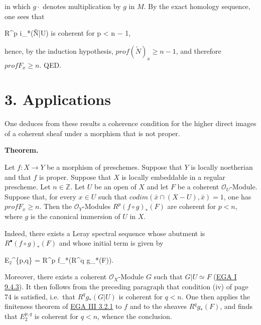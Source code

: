 \documentclass[
  11pt,
  a4paper,
]{book}
\newenvironment{Shaded}{}{}
\newcommand{\NormalTok}[1]{#1}
\begin{document}
in which \(g\cdot\) denotes multiplication by \(g\) in \(M\). By the
exact homology sequence, one sees that

\begin{Shaded}
\begin{Highlighting}[]
\NormalTok{R\^{}p i\_*(Ñ|U)    is coherent for p \textless{} n − 1,}
\end{Highlighting}
\end{Shaded}

hence, by the induction hypothesis,
\(prof(\tilde{N})_{x} \geqslant n - 1\), and therefore
\(prof F_{x} \geqslant n\). QED.

\section{3. Applications}\label{applications}

One deduces from these results a coherence condition for the higher
direct images of a coherent sheaf under a morphism that is not proper.

\textbf{Theorem.}

Let \(f : X \to Y\) be a morphism of preschemes. Suppose that \(Y\) is
locally noetherian and that \(f\) is proper. Suppose that \(X\) is
locally embeddable in a regular prescheme. Let \(n \in \mathbb{Z}\). Let
\(U\) be an open of \(X\) and let \(F\) be a coherent
\(\mathcal{O}_{U}\)-Module. Suppose that, for every \(x \in U\) such
that \(codim(\bar{x} \cap (X - U), \bar{x}) =
1\), one has \(prof F_{x} \geqslant n\). Then the
\(\mathcal{O}_{Y}\)-Modules \(R^{p}(f \circ g)_{*}(F)\) are coherent for
\(p <
n\), where \(g\) is the canonical immersion of \(U\) in \(X\).

Indeed, there exists a Leray spectral sequence whose abutment is
\(R^{\bullet}(f \circ g)_{*}(F)\) and whose initial term is given by

\begin{Shaded}
\begin{Highlighting}[]
\NormalTok{E₂\^{}\{p,q\} = R\^{}p f\_*(R\^{}q g\_*(F)).}
\end{Highlighting}
\end{Shaded}

Moreover, there exists a coherent \(\mathcal{O}_{X}\)-Module \(G\) such
that \(G|U \simeq F\)
(\href{https://jcreinhold.github.io/ega/i/01-09-complements-on-quasi-coherent-sheaves.html\#94-extension-of-quasi-coherent-sheaves}{EGA
I 9.4.3}). It then follows from the preceding paragraph that condition
(iv) of page 74 is satisfied, i.e.~that \(R^{q} g_{*}(G|U)\) is coherent
for \(q < n\). One then applies the finiteness theorem of
\href{https://jcreinhold.github.io/ega/iii/10-ch3-03-finiteness-proper-morphisms.html\#32-the-finiteness-theorem-case-of-usual-schemes}{EGA
III 3.2.1} to \(f\) and to the sheaves \(R^{q} g_{*}(F)\), and finds
that \(E^{p,q}_{2}\) is coherent for \(q < n\), whence the conclusion.
\end{document}
